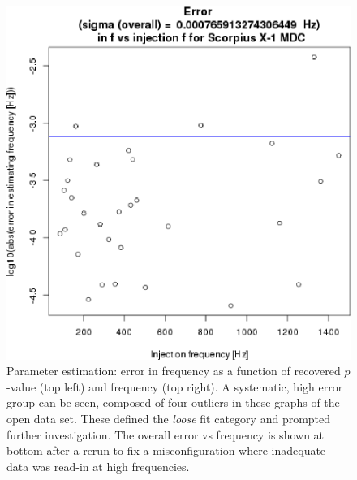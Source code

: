 \begin{figure}
\begin{center}
\includegraphics[width=0.6\paperwidth,height=0.4\paperheight]{plots/ErrorFvsF-overall.eps}
\caption{Parameter estimation: error in frequency as a function of recovered $p$-value (top left) and frequency (top right). A systematic, high error group can be seen, composed of four outliers in these graphs of the open data set. These defined the \textit{loose} fit category and prompted further investigation. The overall error vs frequency is shown at bottom after a rerun to fix a misconfiguration where inadequate data was read-in at high frequencies.
\label{fig:errorf}}
\end{center}
\end{figure}


